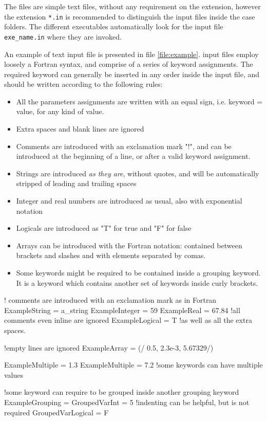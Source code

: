 The files are simple text files, without any requirement on the extension, however the extension \texttt{*.in} is recommended to distinguish the input files inside the case folders. The different executables automatically look for the input file \texttt{exe\_name.in} where they are invoked. 

An example of text input file is presented in file \ref{file:example}. input files employ loosely a Fortran syntax, and comprise of a series of keyword assignments.
The required keyword can generally be inserted in any order inside the input file, and should be written according to the following rules:
\begin{itemize}
\item All the parameters assignments are written with an equal sign, i.e. keyword = value, for any kind of value.
\item Extra spaces and blank lines are ignored
\item Comments are introduced with an exclamation mark "!", and can be introduced at the beginning of a line, or after a valid keyword assignment.
\item Strings are introduced \emph{as they are}, without quotes, and will be automatically stripped of leading and trailing spaces
\item Integer and real numbers are introduced as usual, also with exponential notation
\item Logicals are introduced as "T" for true and "F" for false
\item Arrays can be introduced with the Fortran notation: contained between brackets and slashes and with elements separated by comas. 
\item Some keywords might be required to be contained inside a grouping keyword. It is a keyword which contains another set of keywords inside curly brackets. 
\end{itemize}

\begin{inputfile}[frame=single, caption={example input file}, label={file:example}]
! comments are introduced with an exclamation mark as in Fortran
ExampleString   = a_string
ExampleInteger  = 59
ExampleReal     = 67.84 !all comments even inline are ignored
ExampleLogical  = T     !as well as all the extra spaces.

!empty lines are ignored
ExampleArray = (/ 0.5, 2.3e-3, 5.67329/)

ExampleMultiple = 1.3
ExampleMultiple = 7.2 !some keywords can have multiple values

!some keyword can require to be grouped inside another grouping keyword
ExampleGrouping = {
	GroupedVarInt = 5 !indenting can be helpful, but is not required
    GroupedVarLogical = F
}
\end{inputfile}


